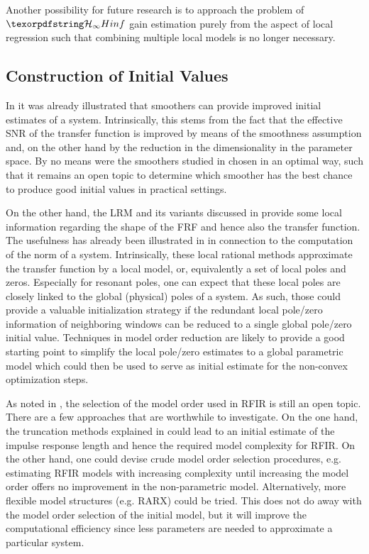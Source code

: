   Another possibility for future research is to approach the problem of $\Hinf$ gain estimation purely from the aspect of local regression such that combining multiple local models is no longer necessary.

  \subsection{Construction of Initial Values}
  In  it was already illustrated that smoothers can provide improved initial estimates of a system. 
  Intrinsically, this stems from the fact that the effective \gls{SNR} of the transfer function is improved by means of the smoothness assumption and, on the other hand by the reduction in the dimensionality in the parameter space.
  By no means were the  smoothers studied in  chosen in an optimal way, such that it remains an open topic to determine which smoother has the best chance to produce good initial values in practical settings.

  On the other hand, the \gls{LRM} and its variants discussed in  provide some local information regarding the shape of the \gls{FRF} and hence also the transfer function.
  The usefulness has already been illustrated in  in connection to the computation of the \Hinf norm of a system.
  Intrinsically, these local rational methods approximate the transfer function by a local model, or, equivalently a set of local poles and zeros.
  Especially for resonant poles, one can expect that these local poles are closely linked to the global (physical) poles of a system.
  As such, those could provide a valuable initialization strategy if the redundant local pole/zero information of neighboring windows can be reduced to a single global pole/zero initial value.
  Techniques in model order reduction are likely to provide a good starting point to simplify the local pole/zero estimates to a global parametric model which could then be used to serve as initial estimate for the non-convex optimization steps.

As noted in , the selection of the model order used in \gls{RFIR} is still an open topic.
There are a few approaches that are worthwhile to investigate.
On the one hand, the truncation methods explained in  could lead to an initial estimate of the impulse response length and hence the required model complexity for \gls{RFIR}.
On the other hand, one could devise crude model order selection procedures, e.g.  estimating \gls{RFIR} models with increasing complexity until increasing the model order offers no improvement in the non-parametric model.
Alternatively, more flexible model structures (e.g. \gls{RARX}) could be tried.
This does not do away with the model order selection of the initial model, but it will improve the computational efficiency since less parameters are needed to approximate a particular system.

  
